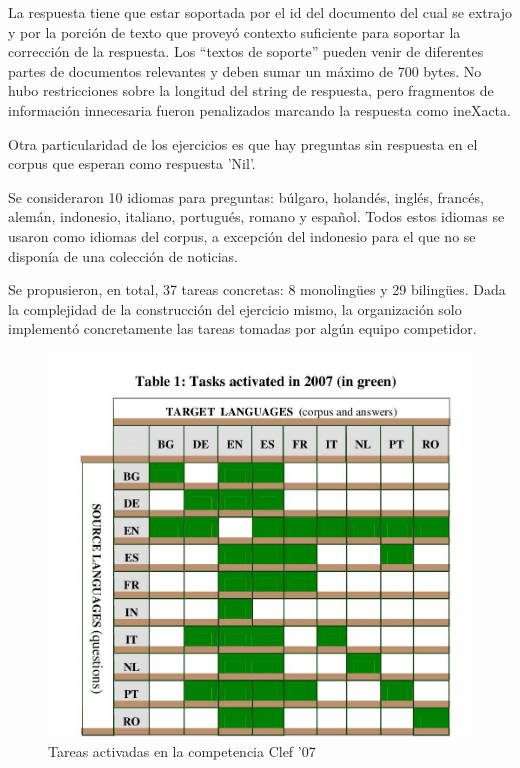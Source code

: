 La respuesta tiene que estar soportada por el id del documento del cual se extrajo y por la porción de texto que proveyó contexto suficiente para soportar la corrección de la respuesta. Los “textos de soporte” pueden venir de diferentes partes de documentos relevantes y deben sumar un máximo de 700 bytes. No hubo restricciones sobre la longitud del string de respuesta, pero fragmentos de información innecesaria fueron penalizados marcando la respuesta como ineXacta. 

Otra particularidad de los ejercicios es que hay preguntas sin respuesta en el corpus que esperan como respuesta 'Nil'.


Se consideraron 10 idiomas para preguntas: búlgaro, holandés, inglés, francés, alemán, indonesio, italiano, portugués, romano y español. Todos estos idiomas se usaron como idiomas del corpus, a excepción del indonesio para el que no se disponía de una colección de noticias.

Se propusieron, en total, 37 tareas concretas: 8 monolingües y 29 bilingües. Dada la complejidad de la construcción del ejercicio mismo, la organización solo implementó concretamente las tareas tomadas por algún equipo competidor. 


\begin{figure}
  \centering
    \includegraphics[scale=0.5]{graficos/clef07}
  \caption{Tareas activadas en la competencia Clef '07}
  \label{fig:tareas}
\end{figure}

